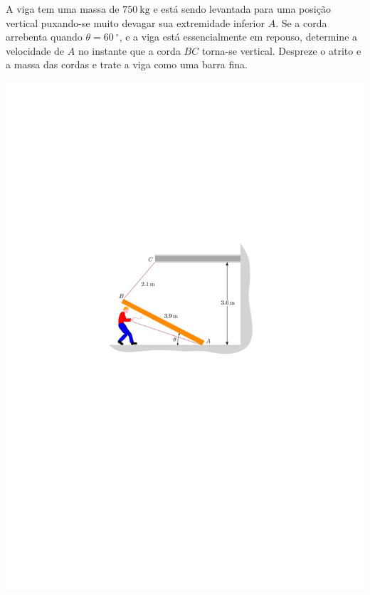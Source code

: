 \item A viga tem uma massa de $\SI{750}{\kilogram}$ e está sendo levantada para uma posição vertical puxando-se muito devagar sua extremidade inferior $A$. Se a corda arrebenta quando $\theta=\SI{60}{^{\circ}}$, e a viga está essencialmente em repouso, determine a velocidade de $A$ no instante que a corda $BC$ torna-se vertical. Despreze o atrito e a massa das cordas e trate a viga como uma barra fina.

\begin{flushright}
	\includegraphics[scale=1.25]{../../images/draw_4_2}
\end{flushright}
